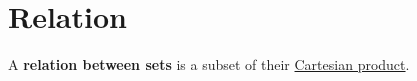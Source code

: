 \chapter{Relation}

\begin{definizione}
A \textbf{relation between sets} is a subset of their \href{CartesianProduct.html}{Cartesian product}.
\end{definizione}

